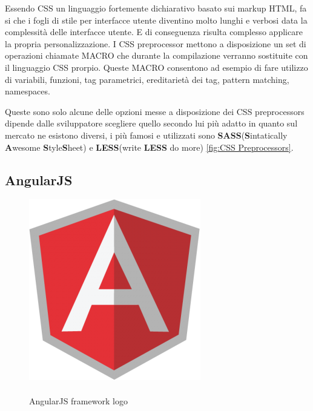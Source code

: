 Essendo CSS un linguaggio fortemente dichiarativo basato sui markup HTML, fa si che i fogli di stile per interfacce utente diventino molto lunghi e verbosi data la complessità delle interfacce utente. E di conseguenza risulta complesso applicare la propria personalizzazione.
I CSS preprocessor mettono a disposizione un set di operazioni chiamate MACRO che durante la compilazione verranno sostituite con il linguaggio CSS prorpio. Queste MACRO consentono ad esempio di fare utilizzo di variabili, funzioni, tag parametrici, ereditarietà dei tag, pattern matching, namespaces.

Queste sono solo alcune delle opzioni messe a disposizione dei CSS preprocessors dipende dalle sviluppatore scegliere quello secondo lui più adatto in quanto sul mercato ne esistono diversi, i più famosi e utilizzati sono \textbf{SASS}(\textbf{S}intatically \textbf{A}wesome \textbf{S}tyle\textbf{S}heet) e \textbf{LESS}(write \textbf{LESS} do more) \ref{fig:CSS Preprocessors}.

\subsection{AngularJS}
\label{sec:angularjs}

\begin{figure}
  \vspace{-65pt}
  \begin{center}
    \includegraphics[scale=0.40]{Figures/angular-logo.png}
  \end{center}
  \vspace{-10pt}
  \caption{\\AngularJS framework logo}
  \label{fig:AngularJS}
  \vspace{10pt}
\end{figure}

